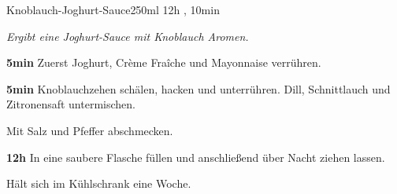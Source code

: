\documentclass[../recipe-collections/cooking.tex]{subfiles}
\begin{document}
\begin{recipe}{Knoblauch-Joghurt-Sauce}{250ml }{12h , 10min }

  \freeform{}\textit{Ergibt eine Joghurt-Sauce mit Knoblauch Aromen.}


  \textbf{5min}
  Zuerst Joghurt, Crème Fraîche und Mayonnaise verrühren.


  \textbf{5min}
  Knoblauchzehen schälen, hacken und unterrühren.
  Dill, Schnittlauch und Zitronensaft untermischen.


  Mit Salz und Pfeffer abschmecken.

  \newstep{}\textbf{12h}
  In eine saubere Flasche füllen und anschließend über Nacht ziehen lassen.

  \freeform{}\hrulefill{}

  \freeform{}
  Hält sich im Kühlschrank eine Woche.

\end{recipe}
\end{document}
